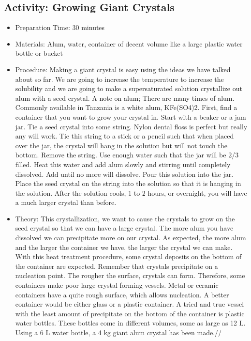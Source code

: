 \begin{itemize}
{\begin{itemize}
\subsection{Activity: Growing Giant Crystals}
\begin{itemize}
\item{Preparation Time: 30 minutes}
\item{Materials: Alum, water, container of decent volume like a large plastic water bottle or bucket}
\item{Procedure: Making a giant crystal is easy using the ideas we have talked about so far. We are going to increase the temperature to increase the solubility and we are going to make a supersaturated solution crystallize out alum with a seed crystal. A note on alum; There are many times of alum. Commonly available in Tanzania is a white alum, KFe(SO4)2. First, find a container that you want to grow your crystal in. Start with a beaker or a jam jar. Tie a seed crystal into some string. Nylon dental floss is perfect but really any will work. Tie this string to a stick or a pencil such that when placed over the jar, the crystal will hang in the solution but will not touch the bottom. Remove the string. Use enough water such that the jar will be 2/3 filled. Heat this water and add alum slowly and stirring until completely dissolved. Add until no more will dissolve. Pour this solution into the jar. Place the seed crystal on the string into the solution so that it is hanging in the solution. After the solution cools, 1 to 2 hours, or overnight, you will have a much larger crystal than before. }
\item{Theory: This crystallization, we want to cause the crystals to grow on the seed crystal so that we can have a large crystal. The more alum you have dissolved we can precipitate more on our crystal. As expected, the more alum and the larger the container we have, the larger the crystal we can make. With this heat treatment procedure, some crystal deposits on the bottom of the container are expected. Remember that crystals precipitate on a nucleation point. The rougher the surface, crystals can form. Therefore, some containers make poor large crystal forming vessels. Metal or ceramic containers have a quite rough surface, which allows nucleation. A better container would be either glass or a plastic container. A tried and true vessel with the least amount of precipitate on the bottom of the container is plastic water bottles. These bottles come in different volumes, some as large as 12 L. Using a 6 L water bottle, a 4 kg giant alum crystal has been made.//
}
\end{itemize}
\end{itemize}}
\end{itemize}
